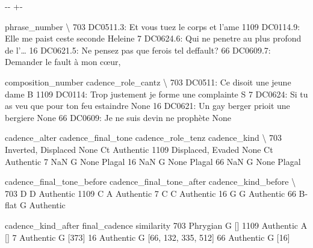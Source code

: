 \documentclass[letterpaper,10pt,english]{sphinxmanual}
\newlength\nbsphinxcodecellspacing
\begin{document}
{

\kern-\sphinxverbatimsmallskipamount\kern-\baselineskip
\kern+\FrameHeightAdjust\kern-\fboxrule
\vspace{\nbsphinxcodecellspacing}

\begin{sphinxVerbatim}[commandchars=\\\{\}]
\llap{\color{nbsphinxout}[23]:\,\hspace{\fboxrule}\hspace{\fboxsep}}                                          phrase\_number  \textbackslash{}
703            DC0511.3: Et vous tuez le corps et l’ame
1109      DC0114.9: Elle me paist ceste seconde Heleine
7     DC0624.6: Qui ne penetre au plus profond de l'{\ldots}
16     DC0621.5: Ne pensez pas que ferois tel deffault?
66              DC0609.7: Demander le fault à mon cœur,

                                   composition\_number cadence\_role\_cantz  \textbackslash{}
703                  DC0511: Ce disoit une jeune dame                  B
1109   DC0114: Trop justement je forme une complainte                  S
7     DC0624: Si tu as veu que pour ton feu estaindre               None
16          DC0621: Un gay berger prioit une bergiere               None
66               DC0609: Je ne suis devin ne prophète               None

            cadence\_alter cadence\_final\_tone cadence\_role\_tenz cadence\_kind  \textbackslash{}
703   Inverted, Displaced               None                Ct    Authentic
1109    Displaced, Evaded               None                Ct    Authentic
7                     NaN                  G              None       Plagal
16                    NaN                  G              None       Plagal
66                    NaN                  G              None       Plagal

     cadence\_final\_tone\_before cadence\_final\_tone\_after cadence\_kind\_before  \textbackslash{}
703                          D                        D           Authentic
1109                         C                        A           Authentic
7                            C                        C           Authentic
16                           G                        G           Authentic
66                      B-flat                        G           Authentic

     cadence\_kind\_after final\_cadence           similarity
703            Phrygian             G                   []
1109          Authentic             A                   []
7             Authentic             G                [373]
16            Authentic             G  [66, 132, 335, 512]
66            Authentic             G                 [16]
\end{sphinxVerbatim}
}
\end{document}
